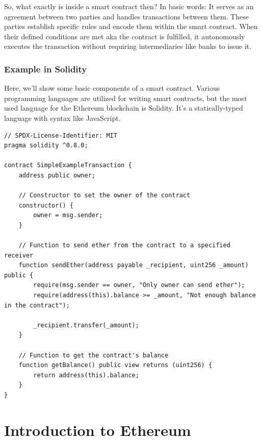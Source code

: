 \documentclass{article}
\begin{document}
So, what exactly is inside a smart contract then? In basic words: It serves as an agreement between two parties and handles transactions between them. These parties establish specific rules and encode them within the smart contract. When their defined conditions are met aka the contract is fulfilled, it autonomously executes the transaction without requiring intermediaries like banks to issue it.

\subsubsection{Example in Solidity}
Here, we'll show some basic components of a smart contract. Various programming languages are utilized for writing smart contracts, but the most used language for the Ethereum blockchain is Solidity. It's a statically-typed language with syntax like JavaScript.

\begin{verbatim}
// SPDX-License-Identifier: MIT
pragma solidity ^0.8.0;

contract SimpleExampleTransaction {
    address public owner;

    // Constructor to set the owner of the contract
    constructor() {
        owner = msg.sender;
    }

    // Function to send ether from the contract to a specified receiver 
    function sendEther(address payable _recipient, uint256 _amount) public {
        require(msg.sender == owner, "Only owner can send ether");
        require(address(this).balance >= _amount, "Not enough balance in the contract");

        _recipient.transfer(_amount);
    }

    // Function to get the contract's balance
    function getBalance() public view returns (uint256) {
        return address(this).balance;
    }
}

\end{verbatim}
\section{Introduction to Ethereum}
\end{document}
